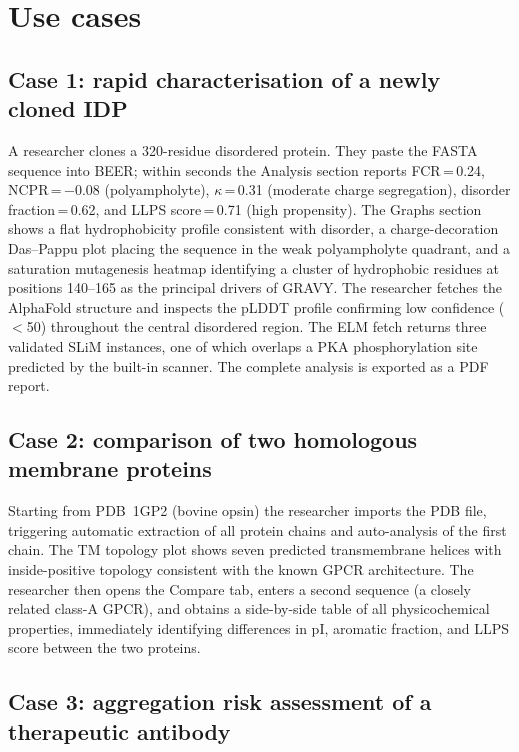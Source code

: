 \documentclass[12pt]{article}
\begin{document}
\section{Use cases}
\label{sec:usecases}

\subsection{Case 1: rapid characterisation of a newly cloned IDP}

A researcher clones a 320-residue disordered protein.
They paste the FASTA sequence into BEER; within seconds the Analysis section
reports FCR\,=\,0.24, NCPR\,=\,$-$0.08 (polyampholyte), $\kappa$\,=\,0.31
(moderate charge segregation), disorder fraction\,=\,0.62, and
LLPS score\,=\,0.71 (high propensity).
The Graphs section shows a flat hydrophobicity profile consistent with
disorder, a charge-decoration Das--Pappu plot placing the sequence in the
weak polyampholyte quadrant, and a saturation mutagenesis heatmap identifying
a cluster of hydrophobic residues at positions 140--165 as the principal
drivers of GRAVY.
The researcher fetches the AlphaFold structure and inspects the pLDDT profile
confirming low confidence ($<$50) throughout the central disordered region.
The ELM fetch returns three validated SLiM instances, one of which overlaps
a PKA phosphorylation site predicted by the built-in scanner.
The complete analysis is exported as a PDF report.

\subsection{Case 2: comparison of two homologous membrane proteins}

Starting from PDB~1GP2 (bovine opsin) the researcher imports the PDB file,
triggering automatic extraction of all protein chains and auto-analysis of
the first chain.
The TM topology plot shows seven predicted transmembrane helices with
inside-positive topology consistent with the known GPCR architecture.
The researcher then opens the Compare tab, enters a second sequence (a closely
related class-A GPCR), and obtains a side-by-side table of all physicochemical
properties, immediately identifying differences in pI, aromatic fraction, and
LLPS score between the two proteins.

\subsection{Case 3: aggregation risk assessment of a therapeutic antibody}
\end{document}
